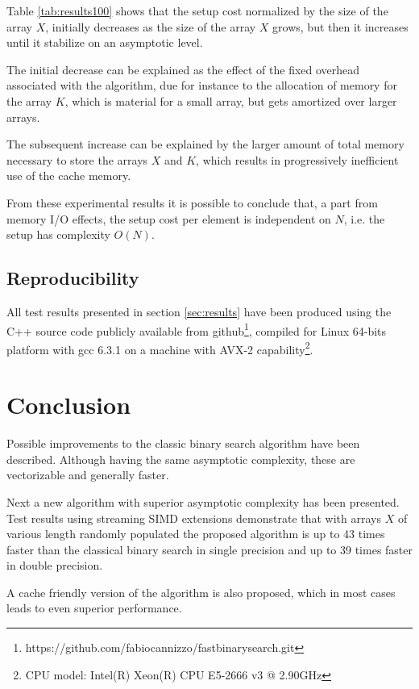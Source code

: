 \documentclass[preprint,1p,times]{elsarticle}
\begin{document}
Table \ref{tab:results100} shows that the setup cost normalized by the size of the array $X$, initially decreases as the size of the array $X$ grows, but then it increases until it stabilize on an asymptotic level.

The initial decrease can be explained as the effect of the fixed overhead associated with the algorithm, due for instance to the allocation of memory for the array $K$, which is material for a small array, but gets amortized over larger arrays. 

The subsequent increase can be explained by the larger amount of total memory necessary to store the arrays $X$ and $K$, which results in progressively inefficient use of the cache memory.

From these experimental results it is possible to conclude that, a part from memory I/O effects, the setup cost per element is independent on $N$, i.e. the setup has complexity $O(N)$.

\subsection{Reproducibility}
All test results presented in section \ref{sec:results} have been produced using the C++ source code publicly available from  github\footnote{https://github.com/fabiocannizzo/fastbinarysearch.git}, compiled for Linux 64-bits platform
with gcc 6.3.1 on a machine with AVX-2 capability\footnote{CPU model: Intel(R) Xeon(R) CPU E5-2666 v3 @ 2.90GHz}.


\section{Conclusion}
Possible improvements to the classic binary search algorithm have been described. Although having the same asymptotic complexity, these are vectorizable and generally faster.

Next a new algorithm with superior asymptotic complexity has been presented. Test results using streaming SIMD extensions demonstrate that with arrays $X$ of various length randomly populated the proposed algorithm is up to 43 times faster than the classical binary search in single precision and up to 39 times faster in double precision.

A cache friendly version of the algorithm is also proposed, which in most cases leads to even superior performance.
\end{document}
